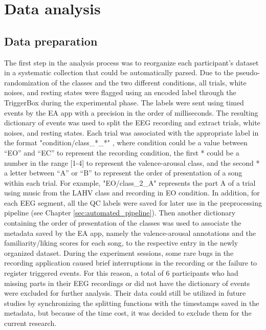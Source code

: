 \section{Data analysis}
\label{sec:data_analysis}
\subsection{Data preparation}
\label{sec:data_preparation}
The first step in the analysis process was to reorganize each participant’s dataset in a systematic collection that could be automatically parsed. Due to the pseudo-randomization of the classes and the two different conditions, all trials, white noises, and resting states were flagged using an encoded label through the TriggerBox during the experimental phase. The labels were sent using timed events by the \ac{EA} app with a precision in the order of milliseconds. The resulting dictionary of events was used to split the \ac{EEG} recording and extract trials, white noises, and resting states. Each trial was associated with the appropriate label in the format "condition/class\_*\_*" , where condition could be a value between “EO” and “EC” to represent the recording condition, the first * could be a number in the range [1-4] to represent the valence-arousal  class, and the second * a letter between “A” or “B” to represent the order of presentation of a song within each trial. For example, "EO/class\_2\_A" represents the part A of a trial using music from the LAHV class and recording in \ac{EO} condition. In addition, for each \ac{EEG} segment, all the \ac{QC} labels were saved for later use in the preprocessing pipeline (see Chapter \ref{sec:automated_pipeline}). Then another dictionary containing the order of presentation of the classes was used to associate the metadata saved by the \ac{EA} app, namely the valence-arousal annotations and the familiarity/liking scores for each song, to the respective entry in the newly organized dataset. During the experiment sessions, some rare bugs in the recording application caused brief interruptions in the recording or the failure to register triggered events. For this reason, a total of 6 participants who had missing parts in their \ac{EEG} recordings or did not have the dictionary of events were excluded for further analysis. Their data could still be utilized in future studies by synchronizing the splitting functions with the timestamps saved in the metadata, but because of the time cost, it was decided to exclude them for the current research.

